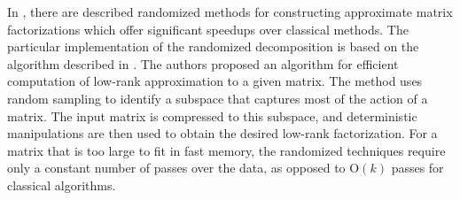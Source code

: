 In \cite{Candes2011, Woolfe2008, Martinsson2011, Szlam2014}, there are described randomized methods for constructing approximate matrix factorizations which offer significant speedups over classical methods. The particular implementation of the randomized decomposition is based on the algorithm described in \cite{Halko2011}. The authors proposed an algorithm for efficient computation of low-rank approximation to a given matrix. The method uses random sampling to identify a subspace that captures most of the action of a matrix. The input matrix is compressed to this subspace, and deterministic manipulations are then used to obtain the desired low-rank factorization. For a matrix that is too large to fit in fast memory, the randomized techniques require only a constant number of passes over the data, as opposed to $\mathrm{O}(k)$ passes for classical algorithms.